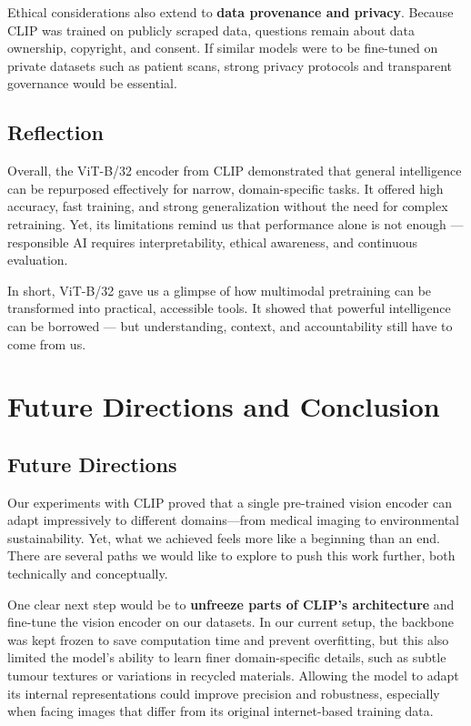 \documentclass[12pt]{article}
\begin{document}
Ethical considerations also extend to \textbf{data provenance and privacy}. Because CLIP was trained on publicly scraped data, questions remain about data ownership, copyright, and consent. If similar models were to be fine-tuned on private datasets such as patient scans, strong privacy protocols and transparent governance would be essential.

\subsection{Reflection}
Overall, the ViT-B/32 encoder from CLIP demonstrated that general intelligence can be repurposed effectively for narrow, domain-specific tasks. It offered high accuracy, fast training, and strong generalization without the need for complex retraining. Yet, its limitations remind us that performance alone is not enough — responsible AI requires interpretability, ethical awareness, and continuous evaluation.  
\vspace{0.3em}

In short, ViT-B/32 gave us a glimpse of how multimodal pretraining can be transformed into practical, accessible tools. It showed that powerful intelligence can be borrowed — but understanding, context, and accountability still have to come from us.

\section{Future Directions and Conclusion}

\subsection{Future Directions}
Our experiments with CLIP proved that a single pre-trained vision encoder can adapt impressively to different domains---from medical imaging to environmental sustainability. Yet, what we achieved feels more like a beginning than an end. There are several paths we would like to explore to push this work further, both technically and conceptually.

One clear next step would be to \textbf{unfreeze parts of CLIP’s architecture} and fine-tune the vision encoder on our datasets. In our current setup, the backbone was kept frozen to save computation time and prevent overfitting, but this also limited the model’s ability to learn finer domain-specific details, such as subtle tumour textures or variations in recycled materials. Allowing the model to adapt its internal representations could improve precision and robustness, especially when facing images that differ from its original internet-based training data.
\end{document}
